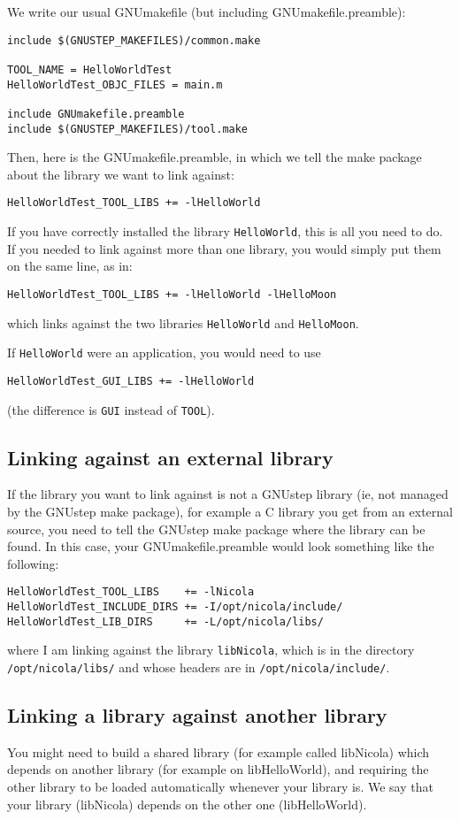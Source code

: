 \documentclass[a4paper]{article}
\begin{document}
We write our usual GNUmakefile (but including GNUmakefile.preamble): 
\begin{verbatim}
include $(GNUSTEP_MAKEFILES)/common.make

TOOL_NAME = HelloWorldTest
HelloWorldTest_OBJC_FILES = main.m

include GNUmakefile.preamble
include $(GNUSTEP_MAKEFILES)/tool.make
\end{verbatim}

Then, here is the GNUmakefile.preamble, in which we tell the make
package about the library we want to link against:
\begin{verbatim}
HelloWorldTest_TOOL_LIBS += -lHelloWorld
\end{verbatim}

If you have correctly installed the library \texttt{HelloWorld}, 
this is all you need to do.  If you needed to link against more than 
one library, you would simply put them on the same line, as in: 
\begin{verbatim}
HelloWorldTest_TOOL_LIBS += -lHelloWorld -lHelloMoon
\end{verbatim}
which links against the two libraries \texttt{HelloWorld} and 
\texttt{HelloMoon}.

If \texttt{HelloWorld} were an application, you would need to use 
\begin{verbatim}
HelloWorldTest_GUI_LIBS += -lHelloWorld
\end{verbatim}
(the difference is \texttt{GUI} instead of \texttt{TOOL}).

\subsection{Linking against an external library}
If the library you want to link against is not a GNUstep library (ie,
not managed by the GNUstep make package), for example a C library you
get from an external source, you need to tell the GNUstep make package
where the library can be found.  In this case, your GNUmakefile.preamble 
would look something like the following:
\begin{verbatim}
HelloWorldTest_TOOL_LIBS    += -lNicola
HelloWorldTest_INCLUDE_DIRS += -I/opt/nicola/include/
HelloWorldTest_LIB_DIRS     += -L/opt/nicola/libs/
\end{verbatim}
where I am linking against the library \texttt{libNicola}, 
which is in the directory \texttt{/opt/nicola/libs/} and whose 
headers are in \texttt{/opt/nicola/include/}.

\subsection{Linking a library against another library}
You might need to build a shared library (for example called
libNicola) which depends on another library (for example on
libHelloWorld), and requiring the other library to be loaded
automatically whenever your library is.  We say that your library
(libNicola) depends on the other one (libHelloWorld).
\end{document}
